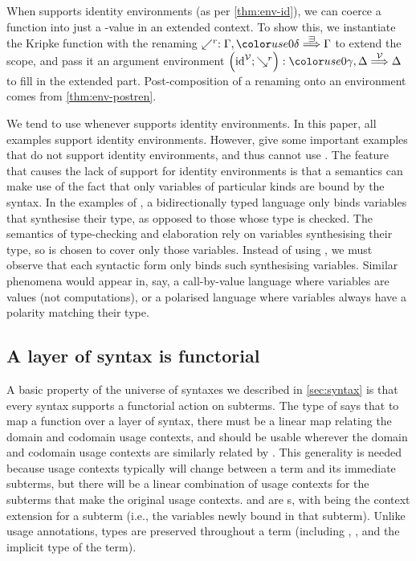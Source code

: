 When \AgdaBound{$\V$} supports identity environments (as per \cref{thm:env-id}),
we can coerce a  function into just a
\AgdaBound{$\C$}-value in an extended context.
To show this, we instantiate the Kripke function with the renaming
$\swarrow^r : \Gamma, \gr0\delta \env\sqni \Gamma$ to extend the scope, and
pass it an argument environment
$\plr{\id^\V; \searrow^r} : \gr0\gamma, \Delta \env\V \Delta$ to fill in the
extended part.
Post-composition of a renaming onto an environment comes from
\cref{thm:env-postren}.


We tend to use  whenever \AgdaBound{$\V$} supports
identity environments.
In this paper, all examples support identity environments.
However, \citet[p.~27]{AACMM21} give some important examples that do not
support identity environments, and thus cannot use .
The feature that causes the lack of support for identity environments is that
a semantics can make use of the fact that only variables of particular kinds
are bound by the syntax.
In the examples of \citeauthor{AACMM21}, a bidirectionally typed language only
binds variables that synthesise their type, as opposed to those whose type is
checked.
The semantics of type-checking and elaboration rely on variables synthesising
their type, so \AgdaBound{$\V$} is chosen to cover only those variables.
Instead of using , we must observe that each syntactic form
only binds such synthesising variables.
Similar phenomena would appear in, say, a call-by-value language where
variables are values (not computations), or a polarised language where
variables always have a polarity matching their type.

\subsection{A layer of syntax is functorial}

A basic property of the universe of syntaxes we described in \cref{sec:syntax}
is that every syntax supports a functorial action on subterms.
The type of  says that to map a function 
over a layer of syntax, there must be a linear map  relating the
domain and codomain usage contexts, and  should be usable
wherever the domain and codomain usage contexts are similarly related by
.
This generality is needed because usage contexts typically will change between
a term and its immediate subterms, but there will be a linear combination of
usage contexts for the subterms that make the original usage contexts.
 and  are s, with
\AgdaBound{$\Theta$} being the context extension for a subterm (i.e., the
variables newly bound in that subterm).
Unlike usage annotations, types are preserved throughout a term (including
\AgdaBound{$\gamma$}, \AgdaBound{$\delta$}, and the implicit type of the term).

